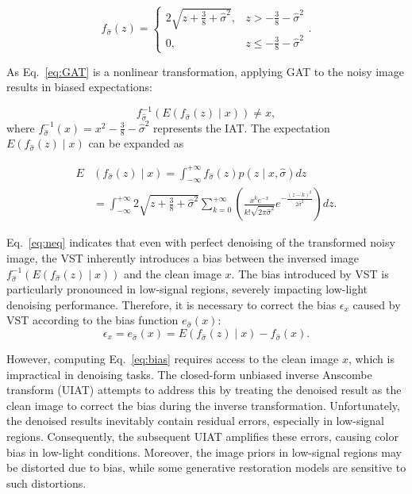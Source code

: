 \documentclass[lettersize,journal]{IEEEtran}
\begin{document}
	\begin{equation}\label{eq:GAT}
		f_{\hat{\sigma}}(z)= \begin{cases}2 \sqrt{z+\frac{3}{8}+\hat{\sigma}^2}, & z>-\frac{3}{8}-\hat{\sigma}^2 \\ 0, & z \leq-\frac{3}{8}-\hat{\sigma}^2\end{cases}.
	\end{equation}
	
	As Eq.~\eqref{eq:GAT} is a nonlinear transformation, applying GAT to the noisy image results in biased expectations:
	
	\begin{equation}\label{eq:neq}
		f^{-1}_{\hat{\sigma}}\left(E\left(f_{\hat{\sigma}}(z) \mid x\right)\right) \neq x,
	\end{equation}
	where \(f_{\hat{\sigma}}^{-1}(x) = x^2 - \frac{3}{8} - \hat{\sigma}^2\) represents the IAT. The expectation \(E\left(f_{\hat{\sigma}}(z) \mid x\right)\) can be expanded as
	
	\begin{equation}
		\begin{aligned}\label{eq:intE}
			E & \left(f_{\hat{\sigma}}(z) \mid x\right)=\int_{-\infty}^{+\infty} f_{\hat{\sigma}}(z) p(z \mid x, \hat{\sigma}) d z \\
			& =\int_{-\infty}^{+\infty} 2 \sqrt{z+\frac{3}{8}+\hat{\sigma}^2} \sum_{k=0}^{+\infty}\left(\frac{x^k e^{-x}}{k ! \sqrt{2 \pi \hat{\sigma}^2}} e^{-\frac{(z-k)^2}{2 \hat{\sigma}^2}}\right) d z.
		\end{aligned}
	\end{equation}
	
	Eq.~\eqref{eq:neq} indicates that even with perfect denoising of the transformed noisy image, the VST inherently introduces a bias between the inversed image $f^{-1}_{\hat{\sigma}}\left(E\left(f_{\hat{\sigma}}(z) \mid x\right)\right)$ and the clean image $x$. The bias introduced by VST is particularly pronounced in low-signal regions, severely impacting low-light denoising performance. Therefore, it is necessary to correct the bias \(\epsilon_x\) caused by VST according to the bias function \(e_{\hat{\sigma}}(x)\):
	\begin{equation}\label{eq:bias}
		\epsilon_x=e_{\hat{\sigma}}(x)=E \left(f_{\hat{\sigma}}(z) \mid x\right) - f_{\hat{\sigma}}(x).
	\end{equation}
	
	However, computing Eq.~\eqref{eq:bias} requires access to the clean image $x$, which is impractical in denoising tasks. The closed-form unbiased inverse Anscombe transform (UIAT)\cite{TIP13/VST} attempts to address this by treating the denoised result as the clean image to correct the bias during the inverse transformation. Unfortunately, the denoised results inevitably contain residual errors, especially in low-signal regions. Consequently, the subsequent UIAT amplifies these errors, causing color bias in low-light conditions. Moreover, the image priors in low-signal regions may be distorted due to bias, while some generative restoration models are sensitive to such distortions.
	
\end{document}
